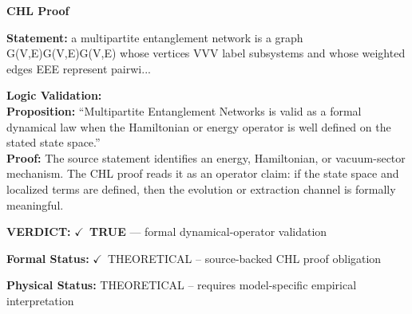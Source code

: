 \vspace{0.45em}
\noindent\textbf{CHL Proof}\par
\textbf{Statement:} a multipartite entanglement network is a graph G(V,E)G(V,E)G(V,E) whose vertices VVV
label subsystems and whose weighted edges EEE represent pairwi...

\textbf{Logic Validation:}\\
\textbf{Proposition:} ``Multipartite Entanglement Networks is valid as a formal dynamical law when the
Hamiltonian or energy operator is well defined on the stated state space.''\\
\textbf{Proof:} The source statement identifies an energy, Hamiltonian, or vacuum-sector mechanism. The
CHL proof reads it as an operator claim: if the state space and localized terms are
defined, then the evolution or extraction channel is formally meaningful.

\textbf{VERDICT:} \ensuremath{\checkmark}\ \textbf{TRUE} --- formal dynamical-operator validation

\textbf{Formal Status:} \ensuremath{\checkmark}\ THEORETICAL -- source-backed CHL proof obligation

\textbf{Physical Status:} THEORETICAL -- requires model-specific empirical interpretation
\par\vspace{0.45em}
\par
\ifTZPDarkEdition
{}
\fi
\endgroup
\endgroup
